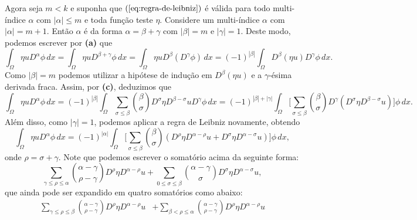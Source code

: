 \documentclass[a4paper, 11pt]{book}
\theoremstyle{definition}
\begin{document}
\begin{prf}
    Agora seja $m < k$ e suponha que $(\ref{eq:regra-de-leibniz})$ é válida para todo multi-índice $\alpha$ com $|\alpha| \leqslant m$ e toda função teste $\eta$.
    Considere um multi-índice $\alpha$ com $|\alpha| = m + 1$.
    Então $\alpha$ é da forma $\alpha = \beta + \gamma$ com $|\beta| = m$ e $|\gamma| = 1$. 
    Deste modo, podemos escrever por \textbf{(a)} que
    \[
        \int_\Omega \eta u D^{\alpha}\phi \, dx = \int_\Omega \eta u D^{\beta + \gamma}\phi \, dx = \int_\Omega \eta u D^\beta(D^\gamma \phi) \, dx = (-1)^{|\beta|} \int_\Omega D^{\beta} (\eta u) D^{\gamma}\phi \,dx.
    \]
    Como $|\beta| = m$ podemos utilizar a hipótese de indução em $D^{\beta}(\eta u)$ e a $\gamma$-ésima derivada fraca. Assim, por \textbf{(c)}, deduzimos que
    {\small
    \[
        \int_\Omega \eta u D^{\alpha}\phi \, dx = (-1)^{|\beta|} \int_\Omega \sum_{\sigma \leqslant \beta} \binom{\beta}{\sigma} D^{\sigma} \eta D^{\beta - \sigma} u D^{\gamma}\phi \, dx = (-1)^{|\beta| + |\gamma|} \int_\Omega \bigg[\sum_{\sigma \leqslant \beta} \binom{\beta}{\sigma} D^{\gamma}(D^{\sigma} \eta D^{\beta - \sigma} u)\bigg] \phi \, dx.
    \]}\!
    Além disso, como $|\gamma| = 1$, podemos aplicar a regra de Leibniz novamente, obtendo
    \begin{equation} \label{eq:integral-etau}
        \int_\Omega \eta u D^{\alpha}\phi \, dx = (-1)^{|\alpha|} \int_\Omega \bigg[\sum_{\sigma \leqslant \beta} \binom{\beta}{\sigma} \left(D^{\rho}\eta D^{\alpha - \rho} u + D^{\sigma} \eta D^{\alpha - \sigma} u\right)\bigg] \phi \,dx,
    \end{equation}
    onde $\rho = \sigma + \gamma$. 
    Note que podemos escrever o somatório acima da seguinte forma:
    \begin{equation*} \label{eq:somatorio}
        \sum_{\gamma \leqslant \rho \leqslant \alpha} \binom{\alpha - \gamma}{\rho - \gamma} D^{\rho}\eta D^{\alpha - \rho} u + \sum_{0 \leqslant\sigma \leqslant \beta} \binom{\alpha - \gamma}{\sigma} D^{\sigma} \eta D^{\alpha - \sigma} u,
    \end{equation*}
    que ainda pode ser expandido em quatro somatórios como abaixo:
    \begin{equation} \label{eq:somatorio-2}
        \begin{aligned}
            \sum_{\gamma \leqslant \rho \leqslant \beta} \binom{\alpha - \gamma}{\rho - \gamma} D^{\rho}\eta D^{\alpha - \rho} u &+ \sum_{\beta < \rho \leqslant \alpha} \binom{\alpha - \gamma}{\rho - \gamma} D^{\rho}\eta D^{\alpha - \rho} u \\

\end{aligned}
\end{equation}
\end{prf}
\end{document}
